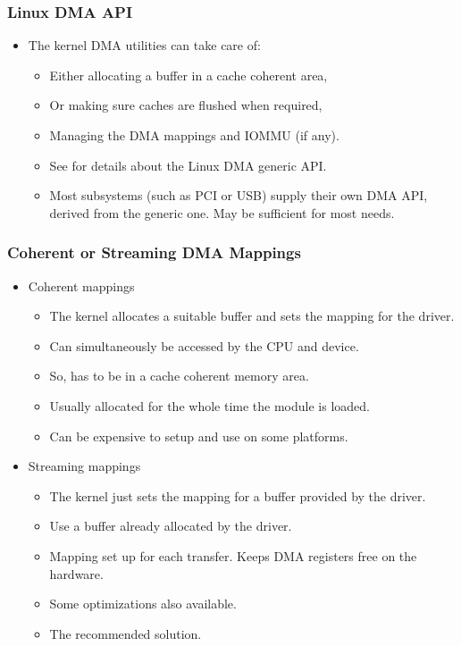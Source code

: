 \begin{frame}
  \frametitle{Linux DMA API}
  \begin{itemize}
  \item The kernel DMA utilities can take care of:
    \begin{itemize}
    \item Either allocating a buffer in a cache coherent area,
    \item Or making sure caches are flushed when required,
    \item Managing the DMA mappings and IOMMU (if any).
    \item See  for details about the
      Linux DMA generic API.
    \item Most subsystems (such as PCI or USB) supply their own DMA
      API, derived from the generic one. May be sufficient for most
      needs.
    \end{itemize}
  \end{itemize}
\end{frame}

\begin{frame}
  \frametitle{Coherent or Streaming DMA Mappings}
  \begin{itemize}
  \item Coherent mappings
    \begin{itemize}
    \item The kernel allocates a suitable buffer and sets the mapping
      for the driver.
    \item Can simultaneously be accessed by the CPU and device.
    \item So, has to be in a cache coherent memory area.
    \item Usually allocated for the whole time the module is loaded.
    \item Can be expensive to setup and use on some platforms.
    \end{itemize}
  \item Streaming mappings
    \begin{itemize}
    \item The kernel just sets the mapping for a buffer provided by
      the driver.
    \item Use a buffer already allocated by the driver.
    \item Mapping set up for each transfer. Keeps DMA registers free
      on the hardware.
    \item Some optimizations also available.
    \item The recommended solution.
    \end{itemize}
  \end{itemize}
\end{frame}

